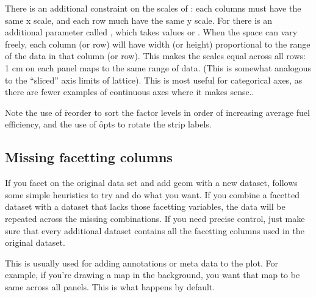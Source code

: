 % 


There is an additional constraint on the scales of : each columns must have the same x scale, and each row much have the same y scale.  For  there is an additional parameter called , which takes values  or .  When the space can vary freely, each column (or row) will have width (or height) proportional to the range of the data in that column (or row).  This makes the scales equal across all rows: 1 cm on each panel maps to the same range of data.  (This is somewhat analogous to the ``sliced'' axis limits of lattice).  This is most useful for categorical axes, as there are fewer examples of continuous axes where it makes sense..

% 
% 
% 

Note the use of \f{reorder} to sort the factor levels in order of increasing average fuel efficiency, and the use of \f{opts} to rotate the strip labels.

\subsection{Missing facetting columns}
\label{sub:missing_facetting_columns}

If you facet on the original data set and add geom with a new dataset, \ggplot follows some simple heuristics to try and do what you want.  If you combine a facetted dataset with a dataset that lacks those facetting variables, the data will be repeated across the missing combinations. If you need precise control, just make sure that every additional dataset contains all the facetting columns used in the original dataset.

This is usually used for adding annotations or meta data to the plot.  For example, if you're drawing a map in the background, you want that map to be same across all panels.  This is what happens by default.

% 
% 
% 


